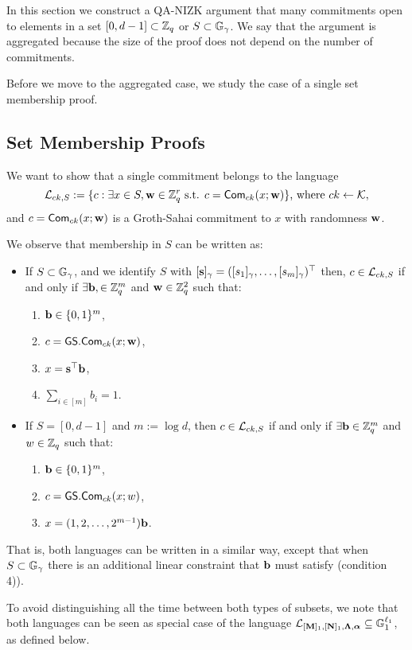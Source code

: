 In this section we construct a QA-NIZK argument that many commitments open to elements in a set $[0,d-1] \subset \mathbb{Z}_q$ or  $S \subset \mathbb{G}_{\gamma}$. We say that the argument is aggregated because the size of the proof does not depend on the number of commitments.

Before we move to the aggregated case, we study the case of a single set membership proof.

 \subsection{Set Membership Proofs}
We want to show that a single commitment belongs to the language
$$
\mathcal{L}_{ck,S}:=\{c: \exists x\in S, \mathbf{w}\in\mathbb{Z}_q^r \text{ s.t. } c=\mathsf{Com}_{ck}(x;\mathbf{w})\}\text{, where }ck\gets\mathcal{K},
$$
and $c=\mathsf{Com}_{ck}(x;\mathbf{w})$ is a Groth-Sahai commitment to $x$ with randomness $\mathbf{w}$.


We observe that membership in $S$ can be written as:
\begin{itemize}
\item If $S \subset \mathbb{G}_{\gamma}$, and we identify $S$ with $[\mathbf{s}]_\gamma=([s_1]_\gamma,\ldots,[s_m]_\gamma)^\top$ then, 
$c \in \mathcal{L}_{ck,S}$ if and only if $\exists \mathbf{b},\in \mathbb{Z}_q^{m}$ and $\mathbf{w}\in\mathbb{Z}_q^2$ such that:
\begin{enumerate}
    \item $\mathbf{b} \in \{0,1\}^{m}$,
    \item $c={\mathsf{GS}}.\mathsf{Com}_{ck}(x;\mathbf{w})$,
    \item $x=\mathbf{s}^{\top} \mathbf{b}$,
    \item $\sum_{i \in [m]} b_i=1$.
\end{enumerate}
\item If $S=[0,d-1]$ and $m:=\log d$, then
$c \in \mathcal{L}_{ck,S}$ if and only if $\exists \mathbf{b} \in \mathbb{Z}_q^{m}$ and $w\in\mathbb{Z}_q$ such that:
\begin{enumerate}   
    \item $\mathbf{b} \in \{0,1\}^{m}$,
    \item $c={\mathsf{GS}}.\mathsf{Com}_{ck}(x;w)$,
    \item $x=(1,2,\ldots,2^{m-1}) \mathbf{b}$.
\end{enumerate}
\end{itemize} 
That is, both languages can be written in a similar way, except that when $S \subset \mathbb{G}_{\gamma}$ there is an additional linear constraint that $\mathbf{b}$ must satisfy (condition 4)). 

 To avoid distinguishing all the time between both types of subsets, we note that both languages can be seen as special case of the language 
 $\mathcal{L}_{[\mathbf{{M}}]_1,[\mathbf{{N}}]_1,\mathbf{{\Lambda}},{\boldsymbol \alpha}}\subseteq\mathbb{G}_1^{\ell_1}$, as defined below.

